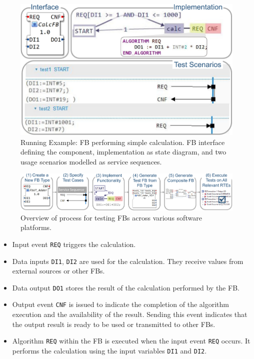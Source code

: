 \documentclass[conference]{IEEEtran}
\begin{document}
\begin{figure}[b]
    \centering
    \vspace{-5mm}
    \includegraphics[width=0.95\columnwidth]{Figures/running_example-crop.pdf}
    \caption{Running Example: FB performing simple calculation. FB interface defining the component, implementation as state diagram, and two usage scenarios modelled as service sequences.}
    \label{fig:running_example}
\end{figure}
\begin{figure}[t!]
	\centering
	\includegraphics[width=1\textwidth]{Figures/process-crop.pdf}
	\caption{Overview of process for testing FBs across various software platforms. }
	\label{methodology}
    \vspace{-5mm}
\end{figure}
\begin{itemize}
   \item Input event \texttt{REQ} triggers the calculation.
   \item Data inputs \texttt{DI1}, \texttt{DI2} are used for the calculation. They receive values from external sources or other FBs.
   \item Data output \texttt{DO1} stores the result of the calculation performed by the FB.
   \item Output event \texttt{CNF} is issued to indicate the completion of the algorithm execution and the availability of the result. Sending this event indicates that the output result is ready to be used or transmitted to other FBs.
   \item Algorithm \texttt{REQ} within the FB is executed when the input event \texttt{REQ} occurs. It performs the calculation using the input variables \texttt{DI1} and \texttt{DI2}.
   
\end{itemize}
\end{document}
